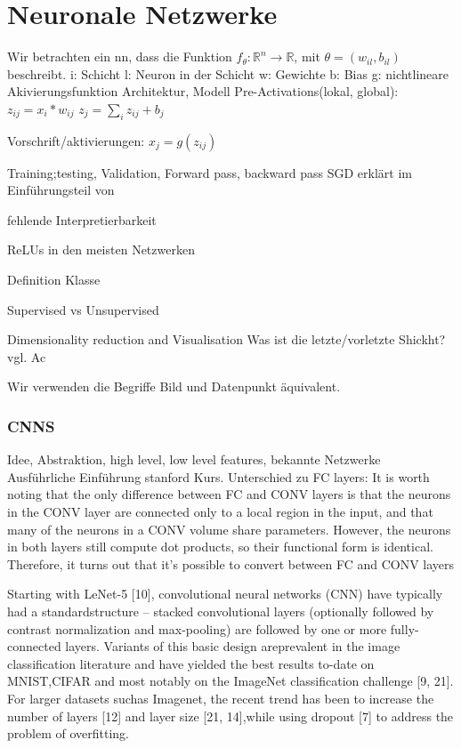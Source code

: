 \documentclass[twoside, 11pt,a4paper]{article}
\numberwithin{equation}{section}
\begin{document}
	\section{Neuronale Netzwerke} \label{chapter_nn}
	Wir betrachten ein \gls{nn}, dass die Funktion $f_{\theta}:\mathbb{R}^n \to\mathbb{R}$, mit $\theta = (w_{il}, b_{il})$ beschreibt. 
	i: Schicht
	l: Neuron in der Schicht
	w: Gewichte 
	b: Bias
	g: nichtlineare Akivierungsfunktion
	Architektur,
	Modell
	Pre-Activations(lokal, global): $z_{ij} = x_i*w_{ij}$
	$z_j = \sum_iz_{ij} + b_j$
	
	Vorschrift/aktivierungen: $x_j = g(z_{ij})$
	
	
	Training;testing, Validation, Forward pass, backward pass
	SGD erklärt im Einführungsteil von \cite{BatchNormalization}
	
	fehlende Interpretierbarkeit
	
	ReLUs in den meisten Netzwerken
	
	Definition Klasse
	
	Supervised vs Unsupervised
	
	Dimensionality reduction and Visualisation
	Was ist die letzte/vorletzte Shickht? vgl. Ac
	
	Wir verwenden die Begriffe Bild und Datenpunkt äquivalent.
	\subsubsection{CNNS}
	Idee, Abstraktion, high level, low level features, bekannte Netzwerke\\
	
	Ausführliche Einführung stanford Kurs\cite{cnn_stanford}. Unterschied zu FC layers: 
	It is worth noting that the only difference between FC and CONV layers is that the neurons in the CONV layer are connected only to a local region in the input, and that many of the neurons in a CONV volume share parameters. However, the neurons in both layers still compute dot products, so their functional form is identical. Therefore, it turns out that it’s possible to convert between FC and CONV layers
	
	Starting with LeNet-5   [10], convolutional neural networks (CNN) have typically had a standardstructure – stacked convolutional layers (optionally followed by contrast normalization and max-pooling)  are  followed  by  one  or  more  fully-connected  layers.   Variants  of  this  basic  design  areprevalent in the image classification literature and have yielded the best results to-date on MNIST,CIFAR and most notably on the ImageNet classification challenge [9, 21].  For larger datasets suchas Imagenet, the recent trend has been to increase the number of layers  [12] and layer size [21, 14],while using dropout [7] to address the problem of overfitting.\cite{goingdeeperwithconvolutions}
	
\end{document}
